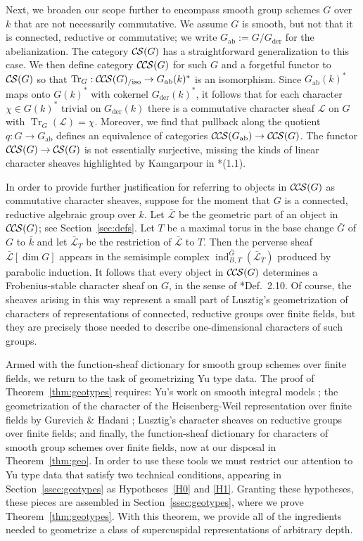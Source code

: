 \documentclass[10pt]{amsart}
\theoremstyle{plain}
\theoremstyle{definition}
\newcommand{\Fq}{k}
\newcommand{\der}{_{\operatorname{der}}}
\newcommand{\ab}{_{\operatorname{ab}}}
\DeclareMathOperator{\Tr}{Tr}
\newcommand{\TrFrob}[1]{\Tr_{#1}}
\newcommand{\cs}[1]{{\mathcal{#1}}}
\newcommand{\gcs}[1]{{\mathcal{\bar #1}}}
\newcommand{\CS}{{\mathcal{C\hskip-0.8pt S}}}
\newcommand{\CCS}{{\mathcal{C\hskip-.8pt C\hskip-0.8pt S}}}
\newcommand{\CCSiso}[1]{\CCS(#1)_{/\text{iso}}}
\newcommand{\bG}{\bar{G}}
\begin{document}
Next, we broaden our scope further to encompass smooth group schemes $G$ over $\Fq$ that are not necessarily commutative.
We assume $G$ is smooth, but not that it is connected, reductive or commutative; we write $G\ab := G/G\der$ for the abelianization.
The category $\CS(G)$ has a straightforward generalization to this case.
We then define category $\CCS(G)$ for such $G$ and a forgetful functor to $\CS(G)$ so that $\TrFrob{G} : \CCSiso{G} \to G\ab(k)^*$
is an isomorphism.  
Since $G\ab(k)^*$ maps onto $G(k)^*$ with cokernel $G\der(k)^*$, it follows that for each character $\chi \in G(k)^*$ trivial on $G\der(k)$ there is a commutative
character sheaf $\cs{L}$ on $G$ with $\TrFrob{G}(\cs{L}) = \chi$. Moreover, we find that pullback along the quotient $q : G \to G\ab$
defines an equivalence of categories $\CCS(G\ab) \to \CCS(G)$.  
The functor $\CCS(G) \to \CS(G)$ is not
essentially surjective, missing the kinds of linear character sheaves highlighted by Kamgarpour in \cite{kamgarpour:09a}*{(1.1)}.

In order to provide further justification for referring to objects in $\CCS(G)$ as commutative character sheaves, suppose for the moment that $G$ is a connected, reductive algebraic group over $\Fq$.
Let $\gcs{L}$ be the geometric part of an object in $\CCS(G)$; see Section~\ref{sec:defs}.
Let $T$ be a maximal torus in the base change $\bG$ of $G$ to $\bar{k}$ and let $\gcs{L}_T$ be the restriction of $\gcs{L}$ to $T$.
Then the perverse sheaf $\gcs{L}[\dim G]$ appears in the semisimple complex $\operatorname{ind}_{B,T}^{\bG}(\gcs{L}_T)$ produced by parabolic induction.
It follows that every object in $\CCS(G)$ determines a Frobenius-stable character sheaf on $G$, in the sense of \cite{lusztig:85a}*{Def.~2.10}. 
Of course, the sheaves arising in this way represent a small part of Lusztig's geometrization of characters of representations of connected, reductive groups over finite fields, but they are precisely those needed to describe one-dimensional characters of such groups. 

Armed with the function-sheaf dictionary for smooth group schemes over finite fields, we return to the task of geometrizing Yu type data. 
The proof of Theorem~\ref{thm:geotypes} requires: Yu's work on smooth integral models \cite{Yu:models}; the geometrization of the character of the Heisenberg-Weil representation over finite fields by Gurevich \& Hadani \cite{gurevich-hadani:07a}; Lusztig's character sheaves on reductive groups over finite fields; and finally, the function-sheaf dictionary for characters of smooth group schemes over finite fields, now at our disposal in Theorem~\ref{thm:geo}.
In order to use these tools we must restrict our attention to Yu type data that satisfy two technical conditions, appearing in Section~\ref{ssec:geotypes} as Hypotheses~\ref{H0} and \ref{H1}. 
Granting these hypotheses, these pieces are assembled in Section~\ref{ssec:geotypes}, where we prove Theorem~\ref{thm:geotypes}.
With this theorem, we provide all of the ingredients needed to geometrize a class of supercuspidal representations of arbitrary depth. 
 
\end{document}
